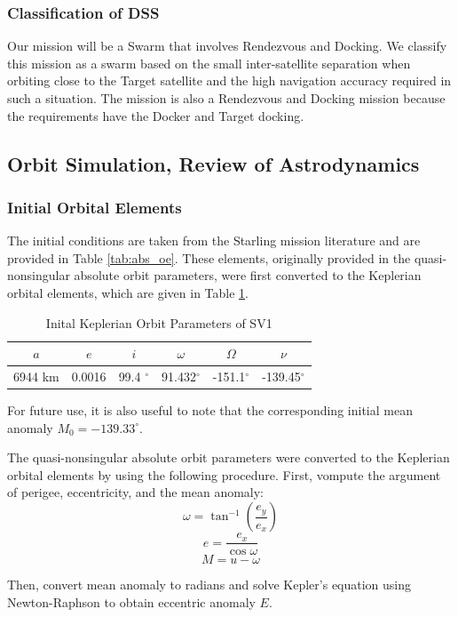 \subsubsection{Classification of DSS} 
Our mission will be a Swarm that involves Rendezvous and Docking. We classify this mission as a swarm based on the small inter-satellite separation when orbiting close to the Target satellite and the high navigation accuracy required in such a situation. The mission is also a Rendezvous and Docking mission because the requirements have the Docker and Target docking.

\subsection{Orbit Simulation, Review of Astrodynamics}
\subsubsection{Initial Orbital Elements} \label{sec:initial_oe}
The initial conditions are taken from the Starling mission literature \cite{krugerorbit} and are provided in Table \ref{tab:abs_oe}. These elements, originally provided in the quasi-nonsingular absolute orbit parameters, were first converted to the Keplerian orbital elements, which are given in Table \ref{tab:abs_oe_kepler}.

\begin{table}[h]
\centering
\begin{tabular}{cccccc} \hline
    $a$ & $e$ & $i$ & $\omega$ & $\Omega$ & $\nu$ \\ \hline 
     6944 km & 0.0016 & 99.4 $^\circ$ & 91.432$^\circ$ & -151.1$^\circ$ & -139.45$^\circ$ \\ \hline
\end{tabular}
\caption{Inital Keplerian Orbit Parameters of SV1}
\label{tab:abs_oe_kepler}
\end{table}

For future use, it is also useful to note that the corresponding initial mean anomaly $M_0= -139.33^\circ$.

The quasi-nonsingular absolute orbit parameters were converted to the Keplerian orbital elements by using the following procedure. First, vompute the argument of perigee, eccentricity, and the mean anomaly:
\[
\omega = \tan^{-1} \left( \frac{e_y}{e_x} \right)
\]
\[
e = \frac{e_x}{\cos \omega}
\]
\[
M = u - \omega
\]

Then, convert mean anomaly to radians and solve Kepler's equation using Newton-Raphson to obtain eccentric anomaly \( E \).

